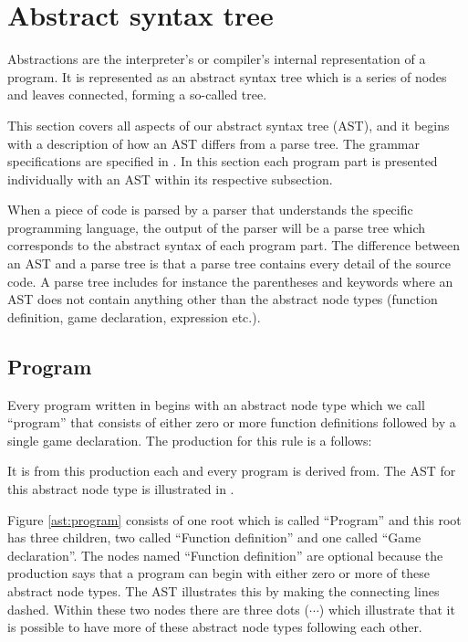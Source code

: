 \section{Abstract syntax tree}
\label{sec:ast}

Abstractions are the interpreter's or compiler's internal representation of a program. It is represented as an abstract syntax tree which is a series of nodes and leaves connected, forming a so-called tree.%

This section covers all aspects of our abstract syntax tree (AST), and it begins with a description of how an AST differs from a parse tree. 
The grammar specifications are specified in . In this section each program part is presented individually with an AST within its respective subsection.%

When a piece of code is parsed by a parser that understands the specific programming language, the output of the parser will be a parse tree which corresponds to the abstract syntax of each program part. The difference between an AST and a parse tree is that a parse tree contains every detail of the source code. A parse tree includes for instance the parentheses and keywords where an AST does not contain anything other than the abstract node types (function definition, game declaration, expression etc.).%

\subsection{Program}%
Every program written in \productname{} begins with an abstract node type which we call ``program'' that consists of either zero or more function definitions followed by a single game declaration. The production for this rule is a follows:%

\begin{ebnf}%
%
\end{ebnf}%

It is from this production each and every program is derived from. The AST for this abstract node type is illustrated in .%

%

Figure \ref{ast:program} consists of one root which is called ``Program'' and this root has three children, two called ``Function definition'' and one called ``Game declaration''. The nodes named ``Function definition'' are optional because the production says that a program can begin with either zero or more of these abstract node types. The AST illustrates this by making the connecting lines dashed. Within these two nodes there are three dots ($\cdots$) which illustrate that it is possible to have more of these abstract node types following each other.%

